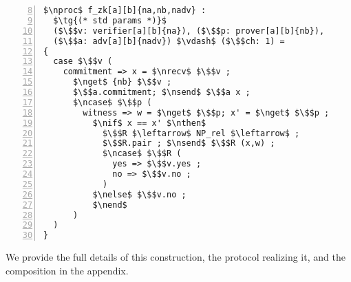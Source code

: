\begin{lstlisting}[basicstyle=\footnotesize\BeraMonottFamily, mathescape, frame=single, numbers=left, xleftmargin=2em, xrightmargin=0.9em, firstnumber=8]
$\nproc$ f_zk[a][b]{na,nb,nadv} :
  $\tg{(* std params *)}$
  ($\$$v: verifier[a][b]{na}), ($\$$p: prover[a][b]{nb}),
  ($\$$a: adv[a][b]{nadv}) $\vdash$ ($\$$ch: 1) =
{
  case $\$$v (
    commitment => x = $\nrecv$ $\$$v ;
      $\nget$ {nb} $\$$v ;
      $\$$a.commitment; $\nsend$ $\$$a x ;
      $\ncase$ $\$$p (
        witness => w = $\nget$ $\$$p; x' = $\nget$ $\$$p ;
          $\nif$ x == x' $\nthen$
            $\$$R $\leftarrow$ NP_rel $\leftarrow$ ;
            $\$$R.pair ; $\nsend$ $\$$R (x,w) ;
            $\ncase$ $\$$R (
              yes => $\$$v.yes ;
              no => $\$$v.no ;
            )
          $\nelse$ $\$$v.no ;
		  $\nend$
	  )
  )
}
\end{lstlisting}
We provide the full details of this construction, the protocol realizing it, and the composition in the appendix. 


